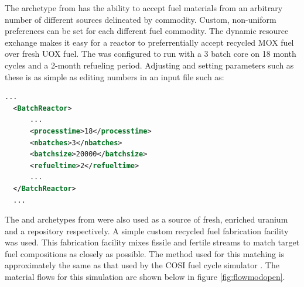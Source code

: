 The  archetype from \Cycamore has the ability to accept
fuel materials from an arbitrary number of different sources delineated by
commodity. Custom, non-uniform preferences can be set for each different fuel
commodity.  The dynamic resource exchange makes it easy for a reactor to
preferrentially accept recycled \gls{MOX} fuel over fresh \gls{UOX} fuel.  The
 was configured to run with a 3 batch core on 18 month cycles and
a 2-month refueling period.  Adjusting and setting parameters such as these is
as simple as editing numbers in an input file such as:

\begin{lstlisting}[language=xml]
  ...
  <BatchReactor>
      ...
      <processtime>18</processtime>
      <nbatches>3</nbatches>
      <batchsize>20000</batchsize>
      <refueltime>2</refueltime>
      ...
  </BatchReactor>
  ...
\end{lstlisting}

The  and  archetypes from \Cycamore were also used as a
source of fresh, enriched uranium and a repository respectively. A simple
custom recycled fuel fabrication facility was used.  This fabrication facility
mixes fissile and fertile streams to match target fuel compositions as closely
as possible.  The method used for this matching is approximately the same as
that used by the \gls{COSI} fuel cycle simulator . The material flows for this simulation are shown below in figure
\ref{fig:flowmodopen}.

